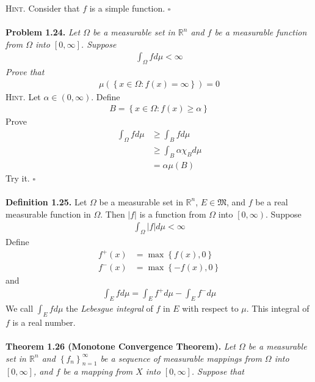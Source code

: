 \documentclass[a4paper]{article}
\numberwithin{equation}{section}
\begin{document}
\textsc{Hint.} Consider that $f$ is a simple function. \hfill $\square$\\
\\
\textbf{Problem 1.24.} \textit{Let $\Omega$ be a measurable set in $\mathbb{R}^n$ and $f$ be a measurable function from $\Omega$ into $\left[0,\infty\right]$. Suppose}
\begin{align}
\int_\Omega {fd\mu }  < \infty 
\end{align}
\textit{Prove that}
\begin{align}
\mu \left( {\left\{ {x \in \Omega :f\left( x \right) = \infty } \right\}} \right) = 0
\end{align}
\textsc{Hint.} Let $\alpha \in \left(0,\infty\right)$. Define
\begin{align}
B = \left\{ {x \in \Omega :f\left( x \right) \ge \alpha } \right\}
\end{align}
Prove
\begin{align}
\int_\Omega  {fd\mu }  &\ge \int_B {fd\mu } \\
& \ge \int_B {\alpha {\chi _B}d\mu } \\
& = \alpha \mu \left( B \right)
\end{align}
Try it. \hfill $\square$\\
\\
\textbf{Definition 1.25.} Let $\Omega$ be a measurable set in $\mathbb{R}^n$, $E \in \mathfrak{M}$, and $f$ be a real measurable function in $\Omega$. Then $\left| f \right|$ is a function from $\Omega$ into $\left[0,\infty\right)$. Suppose 
\begin{align}
\int_\Omega  {\left| f \right|d\mu }  < \infty 
\end{align}
Define
\begin{align}
{f^ + }\left( x \right) &= \max \left\{ {f\left( x \right),0} \right\}\\
{f^ - }\left( x \right) &= \max \left\{ { - f\left( x \right),0} \right\}
\end{align}
and
\begin{align}
\int_E {fd\mu }  = \int_E {{f^ + }d\mu }  - \int_E {{f^ - }d\mu } 
\end{align}
We call $\int_E {fd\mu } $ the \textit{Lebesgue integral} of $f$ in $E$ with respect to $\mu$. This integral of $f$ is a real number.\\
\\
\textbf{Theorem 1.26 (Monotone Convergence Theorem).} \textit{Let $\Omega$ be a measurable set in $\mathbb{R}^n$ and $\left\{ {{f_n}} \right\}_{n = 1}^\infty $ be a sequence of measurable mappings from $\Omega$ into $\left[0,\infty\right]$, and $f$ be a mapping from $X$ into $\left[0,\infty\right]$. Suppose that}
\end{document}
